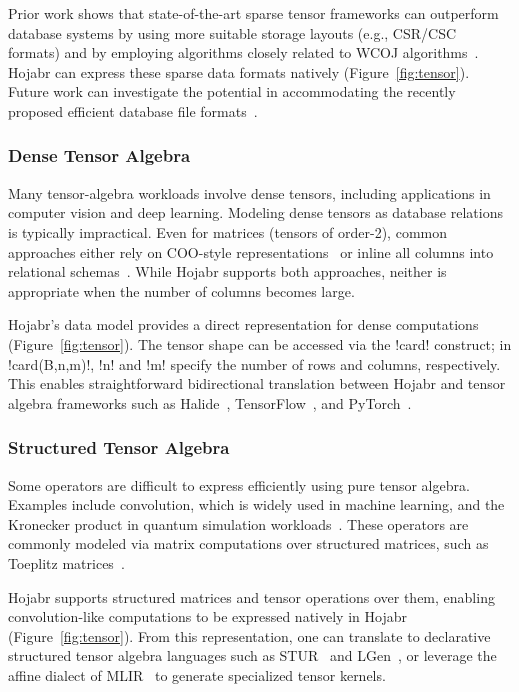 \documentclass[sigconf,nonacm]{acmart}
\begin{document}
Prior work shows that state-of-the-art sparse tensor frameworks can outperform database systems by using more suitable storage layouts (e.g., CSR/CSC formats) and by employing algorithms closely related to WCOJ algorithms~\cite{shaikhha2024tensor,schleich2023optimizing,kovach2023indexed}. Hojabr can express these sparse data formats natively (Figure~\ref{fig:tensor}). Future work can investigate the potential in accommodating the recently proposed efficient database file formats~\cite{afroozeh2025fastlanes}.

\subsubsection{Dense Tensor Algebra}
Many tensor-algebra workloads involve dense tensors, including applications in computer vision and deep learning. Modeling dense tensors as database relations is typically impractical. Even for matrices (tensors of order-2), common approaches either rely on COO-style representations~\cite{blacher2023efficient} or inline all columns into relational schemas~\cite{shahrokhi2024pytond,blacher2022machine}. While Hojabr supports both approaches, neither is appropriate when the number of columns becomes large.

Hojabr’s data model provides a direct representation for dense computations (Figure~\ref{fig:tensor}). The tensor shape can be accessed via the !card! construct; in !card(B,n,m)!, !n! and !m! specify the number of rows and columns, respectively. This enables straightforward bidirectional translation between Hojabr and tensor algebra frameworks such as Halide~\cite{ragan2013halide}, TensorFlow~\cite{abadi2016tensorflow}, and PyTorch~\cite{paszke2019pytorch}.

\subsubsection{Structured Tensor Algebra}
Some operators are difficult to express efficiently using pure tensor algebra. Examples include convolution, which is widely used in machine learning, and the Kronecker product in quantum simulation workloads~\cite{tarabkhah2025synthesis}. These operators are commonly modeled via matrix computations over structured matrices, such as Toeplitz matrices~\cite{ghorbani2023compiling}.

Hojabr supports structured matrices and tensor operations over them, enabling convolution-like computations to be expressed natively in Hojabr (Figure~\ref{fig:tensor}). From this representation, one can translate to declarative structured tensor algebra languages such as STUR~\cite{ghorbani2023compiling} and LGen~\cite{spampinato2016basic}, or leverage the affine dialect of MLIR~\cite{ghorbani2025compressed} to generate specialized tensor kernels.
\end{document}
